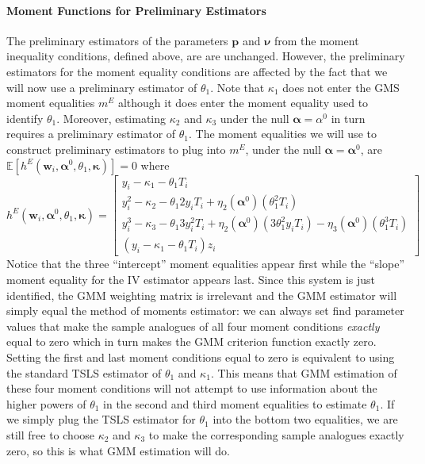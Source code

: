 \documentclass[12pt]{article}
\begin{document}
\paragraph{Moment Functions for Preliminary Estimators}
The preliminary estimators of the parameters $\mathbf{p}$ and $\mathbf{\nu}$ from the moment inequality conditions, defined above, are are unchanged.
However, the preliminary estimators for the moment equality conditions are affected by the fact that we will now use a preliminary estimator of $\theta_1$.
Note that $\kappa_1$ does not enter the GMS moment equalities $m^E$ although it does enter the moment equality used to identify $\theta_1$.
Moreover, estimating $\kappa_2$ and $\kappa_3$ under the null $\mathbf{\alpha} = \alpha^0$ in turn requires a preliminary estimator of $\theta_1$.
The moment equalities we will use to construct preliminary estimators to plug into $m^E$, under the null $\boldsymbol{\alpha} = \boldsymbol{\alpha}^0$, are $\mathbb{E}[h^E(\mathbf{w}_i, \boldsymbol{\alpha}^0, \theta_1, \boldsymbol{\kappa})]=0$ where
\[
  h^E(\mathbf{w}_i, \boldsymbol{\alpha}^0, \theta_1, \boldsymbol{\kappa}) = 
  \left[
  \begin{array}{l}
 y_i - \kappa_1 - \theta_1 T_i\\
  y_i^2 - \kappa_2 - \theta_1 2y_i T_i + \eta_2(\boldsymbol{\alpha}^0) (\theta_1^2 T_i) \\
 y_i^3 - \kappa_3 - \theta_1 3 y_i^2 T_i +  \eta_2(\boldsymbol{\alpha}^0)(3\theta_1^2y_iT_i) -  \eta_3(\boldsymbol{\alpha}^0)(\theta_1^3 T_i)\\
 (y_i - \kappa_1 - \theta_1 T_i)z_i
  \end{array}
\right] 
\]
Notice that the three ``intercept'' moment equalities appear first while the ``slope'' moment equality for the IV estimator appears last.
Since this system is just identified, the GMM weighting matrix is irrelevant and the GMM estimator will simply equal the method of moments estimator: we can always set find parameter values that make the sample analogues of all four moment conditions \emph{exactly} equal to zero which in turn makes the GMM criterion function exactly zero.
Setting the first and last moment conditions equal to zero is equivalent to using the standard TSLS estimator of $\theta_1$ and $\kappa_1$.
This means that GMM estimation of these four moment conditions will not attempt to use information about the higher powers of $\theta_1$ in the second and third moment equalities to estimate $\theta_1$.
If we simply plug the TSLS estimator for $\theta_1$ into the bottom two equalities, we are still free to choose $\kappa_2$ and $\kappa_3$ to make the corresponding sample analogues exactly zero, so this is what GMM estimation will do.
\end{document}
